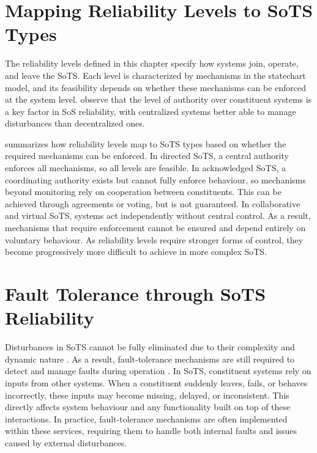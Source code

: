 \section{Mapping Reliability Levels to SoTS Types}\label{sec:reliability-compatibility}



The reliability levels defined in this chapter specify how systems join, operate, and leave the SoTS. Each level is characterized by mechanisms in the statechart model, and its feasibility depends on whether these mechanisms can be enforced at the system level. \citet{ferreira2023towards} observe that the level of authority over constituent systems is a key factor in SoS reliability, with centralized systems better able to manage disturbances than decentralized ones.

 summarizes how reliability levels map to SoTS types based on whether the required mechanisms can be enforced. In directed SoTS, a central authority enforces all mechanisms, so all levels are feasible. In acknowledged SoTS, a coordinating authority exists but cannot fully enforce behaviour, so mechanisms beyond monitoring rely on cooperation between constituents. This can be achieved through agreements or voting, but is not guaranteed. In collaborative and virtual SoTS, systems act independently without central control. As a result, mechanisms that require enforcement cannot be ensured and depend entirely on voluntary behaviour. As reliability levels require stronger forms of control, they become progressively more difficult to achieve in more complex SoTS.


\section{Fault Tolerance through SoTS Reliability}
\label{sec:reducing-fault-tolerance-burden}
Disturbances in SoTS cannot be fully eliminated due to their complexity and dynamic nature \cite{nielsen2015systems,ferreira2023towards}. As a result, fault-tolerance mechanisms are still required to detect and manage faults during operation \cite{hanmer2013patterns,avizienis2004basic}. In SoTS, constituent systems rely on inputs from other systems. When a constituent suddenly leaves, fails, or behaves incorrectly, these inputs may become missing, delayed, or inconsistent. This directly affects system behaviour and any functionality built on top of these interactions. In practice, fault-tolerance mechanisms are often implemented within these services, requiring them to handle both internal faults and issues caused by external disturbances.

